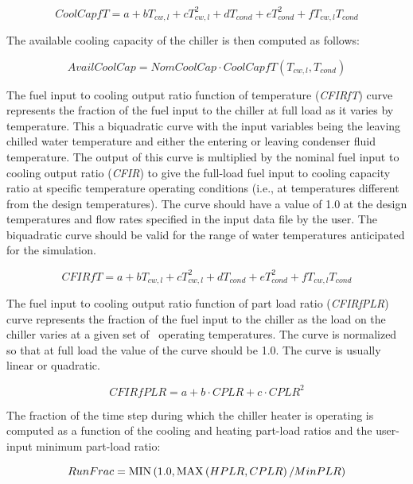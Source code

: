 \begin{equation}
CoolCapfT = a + b{T_{cw,l}} + cT_{cw,l}^2 + d{T_{cond}} + eT_{cond}^2 + f{T_{cw,l}}{T_{cond}}
\end{equation}

The available cooling capacity of the chiller is then computed as follows:

\begin{equation}
AvailCoolCap = NomCoolCap \cdot CoolCapfT({T_{cw,l}},{T_{cond}})
\end{equation}

The fuel input to cooling output ratio function of temperature (\emph{CFIRfT}) curve represents the fraction of the fuel input to the chiller at full load as it varies by temperature. This a biquadratic curve with the input variables being the leaving chilled water temperature and either the entering or leaving condenser fluid temperature. The output of this curve is multiplied by the nominal fuel input to cooling output ratio (\emph{CFIR}) to give the full-load fuel input to cooling capacity ratio at specific temperature operating conditions (i.e., at temperatures different from the design temperatures). The curve should have a value of 1.0 at the design temperatures and flow rates specified in the input data file by the user. The biquadratic curve should be valid for the range of water temperatures anticipated for the simulation.

\begin{equation}
CFIRfT = a + b{T_{cw,l}} + cT_{cw,l}^2 + d{T_{cond}} + eT_{cond}^2 + f{T_{cw,l}}{T_{cond}}
\end{equation}

The fuel input to cooling output ratio function of part load ratio (\emph{CFIRfPLR}) curve represents the fraction of the fuel input to the chiller as the load on the chiller varies at a given set of~ operating temperatures. The curve is normalized so that at full load the value of the curve should be 1.0. The curve is usually linear or quadratic.

\begin{equation}
CFIRfPLR = a + b \cdot CPLR + c \cdot CPL{R^2}
\end{equation}

The fraction of the time step during which the chiller heater is operating is computed as a function of the cooling and heating part-load ratios and the user-input minimum part-load ratio:

\begin{equation}
RunFrac = {\mathop{\rm MIN}\nolimits} \left( {1.0,{\mathop{\rm MAX}\nolimits} \left( {HPLR,CPLR} \right)/MinPLR} \right)
\end{equation}

